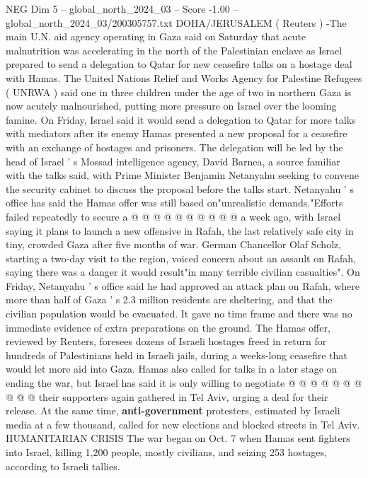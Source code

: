\begin{textsample}{NEG Dim 5 – global\_north\_2024\_03 – Score -1.00 – global\_north\_2024\_03/200305757.txt}  \label{ex:f5_neg_084}
DOHA/JERUSALEM ( Reuters ) -The main U.N. aid agency operating in Gaza said on Saturday that acute malnutrition was accelerating in the north of the Palestinian enclave as Israel prepared to send a delegation to Qatar for new ceasefire talks on a hostage deal with Hamas.
The United Nations Relief and Works Agency for Palestine Refugees ( UNRWA ) said one in three children under the age of two in northern Gaza is now acutely malnourished, putting more pressure on Israel over the looming famine.
On Friday, Israel said it would send a delegation to Qatar for more talks with mediators after its enemy Hamas presented a new proposal for a ceasefire with an exchange of hostages and prisoners.
The delegation will be led by the head of Israel ' s Mossad intelligence agency, David Barnea, a source familiar with the talks said, with Prime Minister Benjamin Netanyahu seeking to convene the security cabinet to discuss the proposal before the talks start.
Netanyahu ' s office has said the Hamas offer was still based on"unrealistic demands."Efforts failed repeatedly to secure a @ @ @ @ @ @ @ @ @ @ a week ago, with Israel saying it plans to launch a new offensive in Rafah, the last relatively safe city in tiny, crowded Gaza after five months of war.
German Chancellor Olaf Scholz, starting a two-day visit to the region, voiced concern about an assault on Rafah, saying there was a danger it would result"in many terrible civilian casualties".
On Friday, Netanyahu ' s office said he had approved an attack plan on Rafah, where more than half of Gaza ' s 2.3 million residents are sheltering, and that the civilian population would be evacuated.
It gave no time frame and there was no immediate evidence of extra preparations on the ground.
The Hamas offer, reviewed by Reuters, foresees dozens of Israeli hostages freed in return for hundreds of Palestinians held in Israeli jails, during a weeks-long ceasefire that would let more aid into Gaza.
Hamas also called for talks in a later stage on ending the war, but Israel has said it is only willing to negotiate @ @ @ @ @ @ @ @ @ @ their supporters again gathered in Tel Aviv, urging a deal for their release.
At the same time, \textbf{anti-government} protesters, estimated by Israeli media at a few thousand, called for new elections and blocked streets in Tel Aviv.
HUMANITARIAN CRISIS The war began on Oct. 7 when Hamas sent fighters into Israel, killing 1,200 people, mostly civilians, and seizing 253 hostages, according to Israeli tallies.

\end{textsample}
